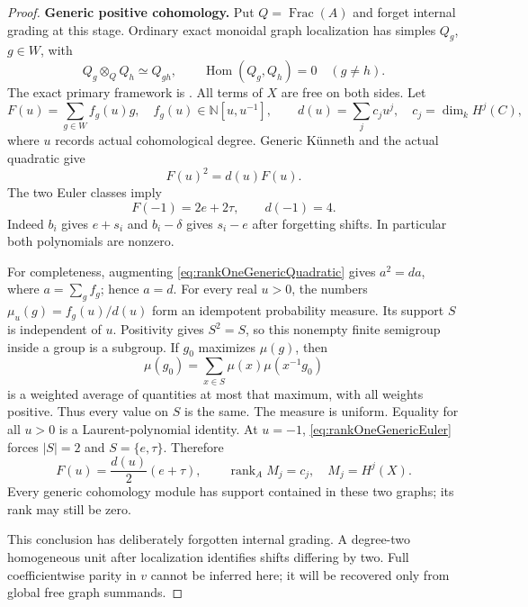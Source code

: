 \begin{proof}
\par\smallskip\noindent\textbf{Generic positive cohomology.}\quad
Put \(Q=\operatorname{Frac}(A)\) and forget internal
grading at this stage. Ordinary exact monoidal graph
localization has simples \(Q_g\), \(g\in W\), with
\[
 Q_g\otimes_QQ_h\simeq Q_{gh},\qquad
 \operatorname{Hom}(Q_g,Q_h)=0\quad(g\ne h).
\]
The exact primary framework is
\cite[\S1.1, equations (1.1)--(1.2);
\S1.2, Theorem~1.6 and Remark~1.7]{EWLocalized}.
All terms of \(X\) are free on both sides.
Let
\[
 F(u)=\sum_{g\in W}f_g(u)g,\quad
 f_g(u)\in\mathbb N[u,u^{-1}],\qquad
 d(u)=\sum_j c_j u^j,\quad c_j=\dim_kH^j(C),
\]
where \(u\) records actual cohomological degree.
Generic K\"unneth and the actual quadratic give
\begin{equation}\label{eq:rankOneGenericQuadratic}
 F(u)^2=d(u)F(u).
\end{equation}
The two Euler classes imply
\begin{equation}\label{eq:rankOneGenericEuler}
 F(-1)=2e+2\tau,\qquad d(-1)=4.
\end{equation}
Indeed \(b_i\) gives \(e+s_i\) and
\(b_i-\delta\) gives \(s_i-e\) after forgetting shifts.
In particular both polynomials are nonzero.

For completeness, augmenting
\eqref{eq:rankOneGenericQuadratic} gives \(a^2=da\),
where \(a=\sum_gf_g\); hence \(a=d\).
For every real \(u>0\), the numbers
\(\mu_u(g)=f_g(u)/d(u)\) form an idempotent probability
measure. Its support \(S\) is independent of \(u\).
Positivity gives \(S^2=S\), so this nonempty finite
semigroup inside a group is a subgroup. If \(g_0\)
maximizes \(\mu(g)\), then
\[
 \mu(g_0)=\sum_{x\in S}\mu(x)\mu(x^{-1}g_0)
\]
is a weighted average of quantities at most that maximum,
with all weights positive. Thus every value on \(S\)
is the same. The measure is uniform.
Equality for all \(u>0\) is a Laurent-polynomial identity.
At \(u=-1\), \eqref{eq:rankOneGenericEuler} forces
\(|S|=2\) and \(S=\{e,\tau\}\). Therefore
\begin{equation}\label{eq:rankOneUniformGraphs}
 F(u)=\frac{d(u)}2(e+\tau),\qquad
 \operatorname{rank}_A M_j=c_j,\quad M_j=H^j(X).
\end{equation}
Every generic cohomology module has support contained
in these two graphs; its rank may still be zero.

This conclusion has deliberately forgotten internal
grading. A degree-two homogeneous unit after localization
identifies shifts differing by two. Full coefficientwise
parity in \(v\) cannot be inferred here; it will be
recovered only from global free graph summands.


\end{proof}
